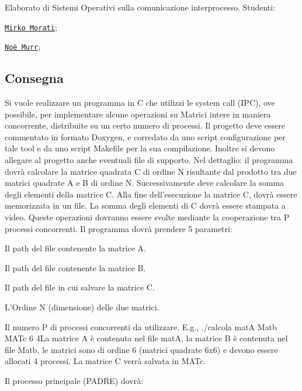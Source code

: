 Elaborato di Sistemi Operativi sulla comunicazione interprocesso. Studenti\+:


\begin{DoxyItemize}
\item \href{https://github.com/mirkomorati}{\tt Mirko Morati};
\item \href{https://github.com/NoeMurr}{\tt Noè Murr};
\end{DoxyItemize}

\subsection*{Consegna}

Si vuole realizzare un programma in C che utilizzi le system call (I\+PC), ove possibile, per implementare alcune operazioni su Matrici intere in maniera concorrente, distribuite su un certo numero di processi. Il progetto deve essere commentato in formato Doxygen, e corredato da uno script configurazione per tale tool e da uno script Makefile per la sua compilazione. Inoltre si devono allegare al progetto anche eventuali file di supporto. Nel dettaglio\+: il programma dovrà calcolare la matrice quadrata C di ordine N risultante dal prodotto tra due matrici quadrate A e B di ordine N. Successivamente deve calcolare la somma degli elementi della matrice C. Alla fine dell’esecuzione la matrice C, dovrà essere memorizzata in un file. La somma degli elementi di C dovrà essere stampata a video. Queste operazioni dovranno essere svolte mediante la cooperazione tra P processi concorrenti. Il programma dovrà prendere 5 parametri\+:


\begin{DoxyEnumerate}
\item Il path del file contenente la matrice A.
\item Il path del file contenente la matrice B.
\item Il path del file in cui salvare la matrice C.
\item L’\+Ordine N (dimensione) delle due matrici.
\item Il numero P di processi concorrenti da utilizzare. E.\+g., ./calcola matA Matb M\+A\+Tc 6 4\+La matrice A è contenuta nel file matA, la matrice B è contenuta nel file Matb, le matrici sono di ordine 6 (matrici quadrate 6x6) e devono essere allocati 4 processi. La matrice C verrà salvata in M\+A\+Tc.
\end{DoxyEnumerate}

Il processo principale (P\+A\+D\+RE) dovrà\+:


